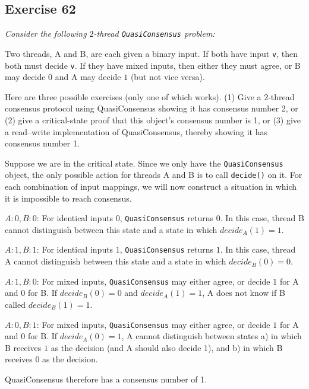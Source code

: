 \documentclass[a4paper,10pt]{article}
\begin{document}
\subsection{Exercise 62}

{\itshape Consider the following $2$-thread \lstinline|QuasiConsensus| problem:

Two threads, A and B, are each given a binary input. If both have input \lstinline|v|, then
both must decide \lstinline|v|. If they have mixed inputs, then either they must agree, or B
may decide $0$ and A may decide $1$ (but not vice versa).

Here are three possible exercises (only one of which works). (1) Give a 2-thread
consensus protocol using QuasiConsensus showing it has consensus number 2,
or (2) give a critical-state proof that this object’s consensus number is 1, or (3)
give a read–write implementation of QuasiConsensus, thereby showing it has
consensus number 1.}

\vspace{3mm}

Suppose we are in the critical state. Since we only have the \lstinline|QuasiConsensus| object,
the only possible action for threads A and B is to call \lstinline|decide()| on it.
For each combination of input mappings, we will now construct a situation in which it is impossible
to reach consensus.

$A: 0, B: 0$: For identical inputs $0$, \lstinline|QuasiConsensus| returns $0$. In this case,
thread B cannot distinguish between this state and a state in which $\textit{decide}_A(1) = 1$.

$A: 1, B: 1$: For identical inputs $1$, \lstinline|QuasiConsensus| returns $1$. In this case,
thread A cannot distinguish between this state and a state in which $\textit{decide}_B(0) = 0$.

$A: 1, B: 0$: For mixed inputs, \lstinline|QuasiConsensus| may either agree, or decide $1$ for A and $0$ for B.
If $\textit{decide}_B(0) = 0$ and $\textit{decide}_A(1) = 1$, A does not know if B called $\textit{decide}_B(1) = 1$.

$A: 0, B: 1$: For mixed inputs, \lstinline|QuasiConsensus| may either agree, or decide $1$ for A and $0$ for B.
If $\textit{decide}_A(0) = 1$, A cannot distinguish between states a) in which B receives $1$ as the decision (and A should also decide 1), and b) in which B receives $0$ as the decision.

QuasiConsensus therefore has a consensus number of 1.
\end{document}
